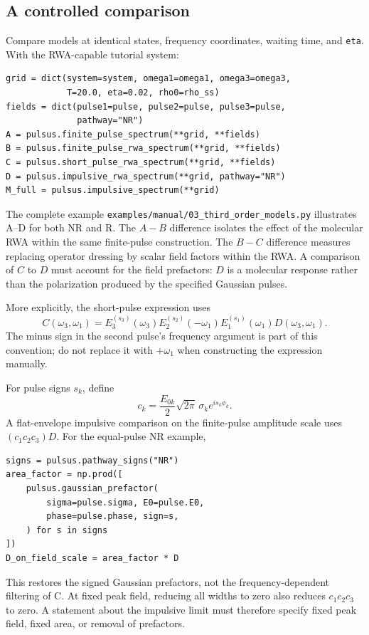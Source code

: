 \subsection{A controlled comparison}

Compare models at identical states, frequency coordinates, waiting time,
and \texttt{eta}. With the RWA-capable tutorial system:
\par\noindent
\begin{minipage}{\linewidth}
\begin{lstlisting}[style=python]
grid = dict(system=system, omega1=omega1, omega3=omega3,
            T=20.0, eta=0.02, rho0=rho_ss)
fields = dict(pulse1=pulse, pulse2=pulse, pulse3=pulse,
              pathway="NR")
A = pulsus.finite_pulse_spectrum(**grid, **fields)
B = pulsus.finite_pulse_rwa_spectrum(**grid, **fields)
C = pulsus.short_pulse_rwa_spectrum(**grid, **fields)
D = pulsus.impulsive_rwa_spectrum(**grid, pathway="NR")
M_full = pulsus.impulsive_spectrum(**grid)
\end{lstlisting}
\end{minipage}\par
The complete example \texttt{examples/manual/03\_third\_order\_models.py}
illustrates A--D for both NR and R. The $A-B$ difference isolates the effect of
the molecular RWA within the same finite-pulse construction. The $B-C$
difference measures replacing operator dressing by scalar field factors
within the RWA. A comparison of $C$ to $D$ must account for the field
prefactors: $D$ is a molecular response rather than the polarization
produced by the specified Gaussian pulses.

More explicitly, the short-pulse expression uses
\[
C(\omega_3,\omega_1)=
E_3^{(s_3)}(\omega_3)E_2^{(s_2)}(-\omega_1)
E_1^{(s_1)}(\omega_1)D(\omega_3,\omega_1).
\]
The minus sign in the second pulse's frequency argument is part of this
convention; do not replace it with $+\omega_1$ when constructing the
expression manually.

For pulse signs $s_k$, define
\begin{equation}
 c_k=\frac{E_{0k}}{2}\sqrt{2\pi}\,\sigma_k e^{is_k\phi_k}.
\end{equation}
A flat-envelope impulsive comparison on the finite-pulse amplitude scale
uses $(c_1c_2c_3)D$. For the equal-pulse NR example,
\par\noindent
\begin{minipage}{\linewidth}
\begin{lstlisting}[style=python]
signs = pulsus.pathway_signs("NR")
area_factor = np.prod([
    pulsus.gaussian_prefactor(
        sigma=pulse.sigma, E0=pulse.E0,
        phase=pulse.phase, sign=s,
    ) for s in signs
])
D_on_field_scale = area_factor * D
\end{lstlisting}
\end{minipage}\par
This restores the signed Gaussian prefactors, not the frequency-dependent
filtering of C. At fixed peak field, reducing all widths to zero also
reduces $c_1c_2c_3$ to zero. A statement about the impulsive limit must
therefore specify fixed peak field, fixed area, or removal of prefactors.

